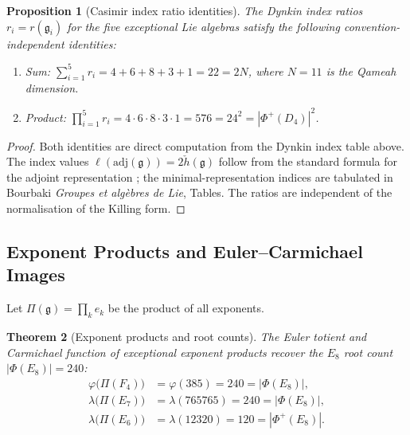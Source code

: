\documentclass[11pt]{amsart}
\theoremstyle{plain}
\newtheorem{theorem}{Theorem}[section]
\newtheorem{proposition}[theorem]{Proposition}
\theoremstyle{definition}
\theoremstyle{remark}
\renewcommand{\Phi}{\varPhi}
\begin{document}
\begin{proposition}[Casimir index ratio identities]\label{prop:casimir-ratio}
The Dynkin index ratios $r_i = r(\mathfrak{g}_i)$ for the five exceptional
Lie algebras satisfy the following convention-independent identities:
\begin{enumerate}
  \item \emph{Sum:}
    $\displaystyle\sum_{i=1}^{5} r_i = 4+6+8+3+1 = 22 = 2N$,
    where $N = 11$ is the Qameah dimension.
  \item \emph{Product:}
    $\displaystyle\prod_{i=1}^{5} r_i = 4\cdot 6\cdot 8\cdot 3\cdot 1
    = 576 = 24^2 = |\Phi^+(\!D_4)|^2$.
\end{enumerate}
\end{proposition}

\begin{proof}
Both identities are direct computation from the Dynkin index table above.
The index values $\ell(\mathrm{adj}(\mathfrak{g})) = 2\check{h}(\mathfrak{g})$ follow
from the standard formula for the adjoint representation
\cite{Humphreys1972}; the minimal-representation indices are tabulated in
Bourbaki \emph{Groupes et alg\`ebres de Lie}, Tables.
The ratios are independent of the normalisation of the Killing form.
\end{proof}

\subsection{Exponent Products and Euler--Carmichael Images}

Let $\Pi(\mathfrak{g}) = \prod_{k} e_k$ be the product of all exponents.

\begin{theorem}[Exponent products and root counts]\label{thm:exponent-products}
The Euler totient and Carmichael function of exceptional exponent products
recover the $E_8$ root count $|\Phi(E_8)| = 240$:
\begin{align}
  \varphi\!\bigl(\Pi(F_4)\bigr) &= \varphi(385) = 240 = |\Phi(E_8)|,
    \label{eq:phi-F4-exps} \\
  \lambda\!\bigl(\Pi(E_7)\bigr) &= \lambda(765765) = 240 = |\Phi(E_8)|,
    \label{eq:lambda-E7-exps} \\
  \lambda\!\bigl(\Pi(E_6)\bigr) &= \lambda(12320) = 120 = |\Phi^+(E_8)|.
    \label{eq:lambda-E6-exps}
\end{align}
\end{theorem}
\end{document}
